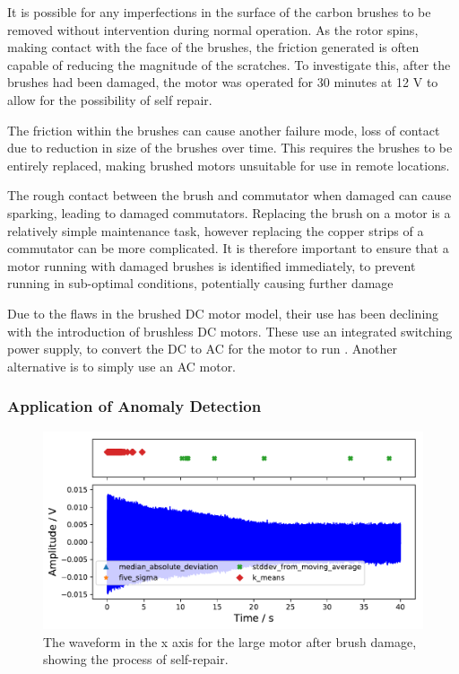 It is possible for any imperfections in the surface of the carbon brushes to be removed without intervention during normal operation. As the rotor spins, making contact with the face of the brushes, the friction generated is often capable of reducing the magnitude of the scratches. To investigate this, after the brushes had been damaged, the motor was operated for 30 minutes at 12 V to allow for the possibility of self repair. %

The friction within the brushes can cause another failure mode, loss of contact due to reduction in size of the brushes over time. This requires the brushes to be entirely replaced, making brushed motors unsuitable for use in remote locations.

The rough contact between the brush and commutator when damaged can cause sparking, leading to damaged commutators. Replacing the brush on a motor is a relatively simple maintenance task, however replacing the copper strips of a commutator can be more complicated. It is therefore important to ensure that a motor running with damaged brushes is identified immediately, to prevent running in sub-optimal conditions, potentially causing further damage

Due to the flaws in the brushed DC motor model, their use has been declining with the introduction of brushless DC motors. These use an integrated switching power supply, to convert the DC to AC for the motor to run \cite{hanselman2003brushless}. Another alternative is to simply use an AC motor. 

\subsubsection{Application of Anomaly Detection}

\begin{figure}[t]
    \includegraphics[width=1.0\textwidth]{fig/large_manual_repair_large_12V.pdf}
    \caption[Anomaly Test Brush Damage]{The waveform in the x axis for the large motor after brush damage, showing the process of self-repair.}
    \label{fig:largemotor_brushdamage}
\end{figure}

